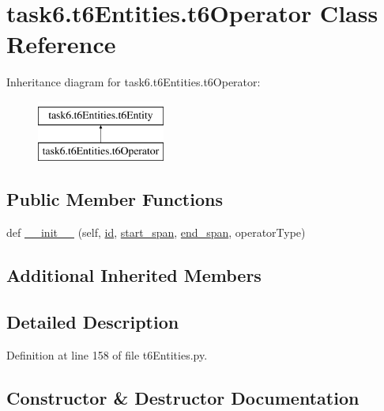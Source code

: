 \hypertarget{classtask6_1_1t6Entities_1_1t6Operator}{}\section{task6.\+t6\+Entities.\+t6\+Operator Class Reference}
\label{classtask6_1_1t6Entities_1_1t6Operator}
Inheritance diagram for task6.\+t6\+Entities.\+t6\+Operator\+:\begin{figure}[H]
\begin{center}
\leavevmode
\includegraphics[height=2.000000cm]{classtask6_1_1t6Entities_1_1t6Operator}
\end{center}
\end{figure}
\subsection*{Public Member Functions}
\begin{DoxyCompactItemize}
\item 
def \hyperlink{classtask6_1_1t6Entities_1_1t6Operator_a742bafc1cb775d74ee2be13f8c880472}{\+\_\+\+\_\+init\+\_\+\+\_\+} (self, \hyperlink{classtask6_1_1t6Entities_1_1t6Entity_a96b2e7fb553c920ab2db6f6deb31e3b4}{id}, \hyperlink{classtask6_1_1t6Entities_1_1t6Entity_a8221c36d2995a24200cdfbd74cc9233c}{start\+\_\+span}, \hyperlink{classtask6_1_1t6Entities_1_1t6Entity_a597d42bb02fc9f42277098f0ce21917c}{end\+\_\+span}, operator\+Type)
\end{DoxyCompactItemize}
\subsection*{Additional Inherited Members}


\subsection{Detailed Description}


Definition at line 158 of file t6\+Entities.\+py.



\subsection{Constructor \& Destructor Documentation}
\mbox{\label{classtask6_1_1t6Entities_1_1t6Operator_a742bafc1cb775d74ee2be13f8c880472}} 
